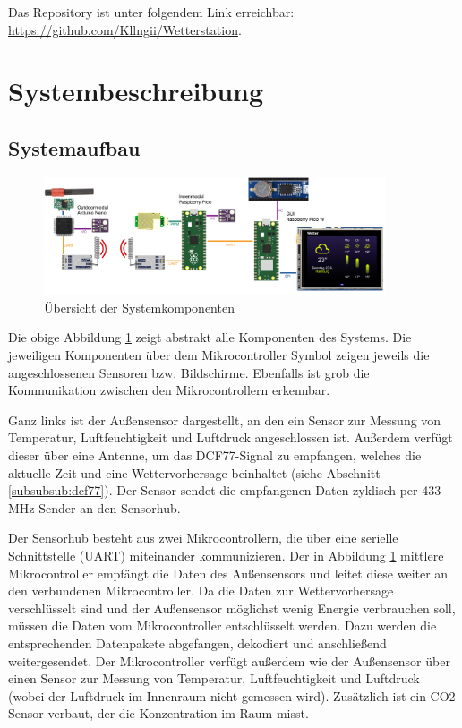 \documentclass[a4paper,11pt]{article}
\begin{document}
\vspace{0.2cm}
\noindent
Das Repository ist unter folgendem Link erreichbar: \url{https://github.com/Kllngii/Wetterstation}.

\section{Systembeschreibung}
\label{sub:systembeschreibung}

\subsection{Systemaufbau}
\label{subsub:systemaufbau}

\begin{figure}[H]
  \centering
  \includegraphics[width = 0.9\textwidth]{Systemuebersicht}
  \caption{Übersicht der Systemkomponenten}
  \label{fig:systemuebersicht}
\end{figure}

Die obige Abbildung \ref{fig:systemuebersicht} zeigt abstrakt alle Komponenten des Systems. Die jeweiligen Komponenten über dem Mikrocontroller Symbol
zeigen jeweils die angeschlossenen Sensoren bzw. Bildschirme. Ebenfalls ist grob die Kommunikation zwischen den Mikrocontrollern erkennbar. 

\vspace{0.2cm}
\noindent
Ganz links ist der Außensensor dargestellt, an den ein Sensor zur Messung von Temperatur, Luftfeuchtigkeit und Luftdruck angeschlossen ist. 
Außerdem verfügt dieser über eine Antenne, um das DCF77-Signal zu empfangen, welches die aktuelle Zeit und eine Wettervorhersage beinhaltet (siehe Abschnitt \ref{subsubsub:dcf77}).
Der Sensor sendet die empfangenen Daten zyklisch per 433 MHz Sender an den Sensorhub. 

\vspace{0.2cm}
\noindent
Der Sensorhub besteht aus zwei Mikrocontrollern, die über eine serielle Schnittstelle (UART) miteinander kommunizieren. Der in Abbildung \ref{fig:systemuebersicht} mittlere Mikrocontroller
empfängt die Daten des Außensensors und leitet diese weiter an den verbundenen Mikrocontroller. Da die Daten zur Wettervorhersage verschlüsselt sind und der Außensensor möglichst
wenig Energie verbrauchen soll, müssen die Daten vom Mikrocontroller entschlüsselt werden. Dazu werden die entsprechenden Datenpakete abgefangen, dekodiert und anschließend weitergesendet. 
Der Mikrocontroller verfügt außerdem wie der Außensensor über einen Sensor zur Messung von Temperatur, Luftfeuchtigkeit und Luftdruck (wobei der Luftdruck im Innenraum nicht gemessen wird). 
Zusätzlich ist ein CO2 Sensor verbaut, der die Konzentration im Raum misst. 
\end{document}
